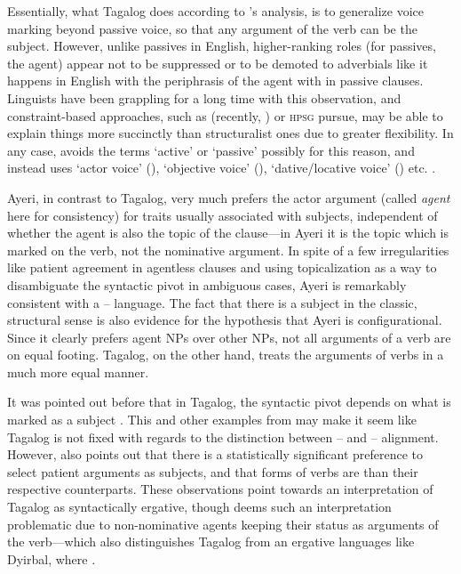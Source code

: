Essentially, what Tagalog does according to \citet{kroeger1991}'s analysis, is
to generalize voice marking beyond passive voice, so that any argument of the
verb can be the subject. However, unlike passives in English, higher-ranking
roles (for passives, the agent) appear not to be suppressed or to be demoted to
adverbials like it happens in English with the periphrasis of the agent with
 in passive clauses. Linguists have been grappling for a long time with
this observation, and constraint-based approaches, such as \Lfg{} (recently,
\cite{bresnan2016}) or \textsc{hpsg} \citep{pollardsag1994} pursue, may be able
to explain things more succinctly than structuralist ones due to greater
flexibility. In any case, \citet{kroeger1991} avoids the terms `active' or
`passive' possibly for this reason, and instead uses `actor voice' (\Av{}),
`objective voice' (\Ov{}), `dative/locative voice' (\Dv{}) etc.
\citep[14--15]{kroeger1991}.

Ayeri, in contrast to Tagalog, very much prefers the actor argument (called
\emph{agent} here for consistency) for traits usually associated with subjects,
independent of whether the agent is also the topic of the clause---in Ayeri it
is the topic which is marked on the verb, not the nominative argument. In spite
of a few irregularities like patient agreement in agentless clauses and using
topicalization as a way to disambiguate the syntactic pivot in ambiguous cases,
Ayeri is remarkably consistent with a \Nom{}--\Acc{} language. The fact that
there is a subject in the classic, structural sense is also evidence for the
hypothesis that Ayeri is configurational. Since it clearly prefers agent NPs
over other NPs, not all arguments of a verb are on equal footing. Tagalog, on
the other hand, treats the arguments of verbs in a much more equal manner.

It was pointed out before that in Tagalog, the syntactic pivot depends on what
is marked as a subject \citep[30--31]{kroeger1991}. This and other examples
from \citet{kroeger1991} may make it seem like Tagalog is not fixed with
regards to the distinction between \Nom{}--\Acc{} and \Erg{}--\Abs{}
alignment. However, \citet{kroeger1991} also points out that there is a
statistically significant preference to select patient arguments as subjects,
and that \Ov{} forms of verbs are  than their respective \Av{} counterparts. These
observations point towards an interpretation of Tagalog as syntactically
ergative, though \citet{kroeger1991} deems such an interpretation problematic
due to non-nominative agents keeping their status as arguments of the
verb---which also distinguishes Tagalog from an ergative languages like
Dyirbal, where .

